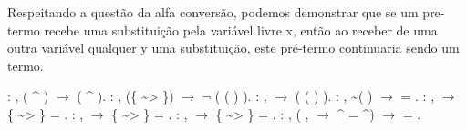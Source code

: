 Respeitando a questão da alfa conversão, podemos demonstrar que se um pre-termo recebe uma substituição pela variável livre x, 
 então ao receber de uma outra variável qualquer y uma substituição, este pré-termo continuaria sendo um termo.\begin{coqdoccode}
\coqdocemptyline
\coqdocnoindent
{} : \coqdockw{\ensuremath{\forall}}   ,  ( \^{} ) \ensuremath{\rightarrow}  ( \^{} ).\coqdoceol
\coqdocemptyline
\coqdocnoindent
{} : \coqdockw{\ensuremath{\forall}}   ,  (\{ \~{}> \}) \ensuremath{\rightarrow} \ensuremath{\lnot} ( ( ) ).\coqdoceol
\coqdocemptyline
\coqdocnoindent
{} : \coqdockw{\ensuremath{\forall}}  ,   \ensuremath{\rightarrow}  ( ( ) ).\coqdoceol
\coqdocemptyline
\coqdocnoindent
{} : \coqdockw{\ensuremath{\forall}}   , \~{}(  ) \ensuremath{\rightarrow}     = .\coqdoceol
\coqdocemptyline
\coqdocnoindent
{} : \coqdockw{\ensuremath{\forall}}   ,   \ensuremath{\rightarrow} \{  \~{}> \}  = .\coqdoceol
\coqdocemptyline
\coqdocnoindent
{} : \coqdockw{\ensuremath{\forall}}   ,   \ensuremath{\rightarrow} \{ \~{}> \}  = .\coqdoceol
\coqdocemptyline
\coqdocnoindent
{} : \coqdockw{\ensuremath{\forall}}   ,   \ensuremath{\rightarrow} \{ \~{}> \}  = .\coqdoceol
\coqdocemptyline
\coqdocnoindent
{} : \coqdockw{\ensuremath{\forall}}   , (\coqdockw{\ensuremath{\forall}} ,    \ensuremath{\rightarrow} \^{} = \^{}) \ensuremath{\rightarrow}   =  .\coqdoceol

\end{coqdoccode}
